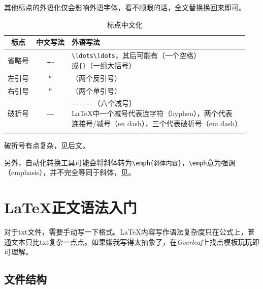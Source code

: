 \documentclass[10pt,openany]{book}
\begin{document}
\begin{sloppypar}
    其他标点的外语化仅会影响外语字体，看不顺眼的话，全文替换换回来即可。

    \begin{center}
        \begin{longtable}{ccl}
            \textbf{标点} & \textbf{中文写法} & \textbf{外语写法}                                                                                       \\
            \hline
            \endfirsthead
            省略号         & \texttt{……}   & \makecell[l]{\texttt{\textbackslash{}ldots\textbackslash{}ldots}，其后可能有\texttt{}（一个空格）               \\或\texttt{\{\}}（一组大括号）} \\
            \hline
            左引号         & \texttt{“}    & \texttt{\textasciigrave{}\textasciigrave{}}（两个反引号）                                                  \\
            \hline
            右引号         & \texttt{”}    & \texttt{\textquotesingle{}\textquotesingle{}}（两个单引号）                                                \\
            \hline
            破折号         & \texttt{——}   & \makecell[l]{\texttt{-\/-\/-\/-\/-\/-}（六个减号）\\{\LaTeX}中一个减号代表连字符（hyphen），两个代表 \\连接号/减号（en dash），三个代表破折号（em dash）}                                            \\
            \hline
            \caption{标点中文化}
        \end{longtable}
    \end{center}

    破折号有点复杂，见后文\emph{}。

    另外，自动化转换工具可能会将斜体转为\texttt{\textbackslash{}emph\{斜体内容\}}，\texttt{\textbackslash{}emph}意为强调（emphasis），并不完全等同于斜体，见\emph{}。

    \section{{\LaTeX}正文语法入门}

    对于txt文件，需要手动写一下格式。{\LaTeX}内容写作语法复杂度只在公式上，普通文本只比txt复杂一点点。如果嫌我写得太抽象了，在\emph{Overleaf}上找点模板玩玩即可理解。

    \subsection{文件结构}


\end{sloppypar}
\end{document}
